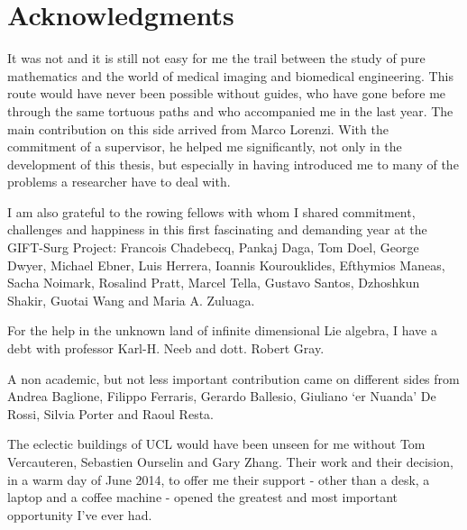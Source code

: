 
\qquad
\pagestyle{empty}
\newpage

\section*{Acknowledgments}
%


It was not and it is still not easy for me the trail between the study of pure mathematics and the world of medical imaging and biomedical engineering. This route would have never been possible without guides, who have gone before me through the same tortuous paths and who accompanied me in the last year. The main contribution on this side arrived from Marco Lorenzi. With the commitment of a supervisor, he helped me significantly, not only in the development of this thesis, but especially in having introduced me to many of the problems a researcher have to deal with.

I am also grateful to the rowing fellows with whom I shared commitment, challenges and happiness in this first fascinating and demanding year at the GIFT-Surg Project: 
Francois Chadebecq, 
Pankaj Daga, 
Tom Doel, 
George Dwyer,
Michael Ebner,
Luis Herrera,
Ioannis Kourouklides,
Efthymios Maneas,
Sacha Noimark,
Rosalind Pratt,
Marcel Tella,
Gustavo Santos,
Dzhoshkun Shakir,
Guotai Wang and Maria A. Zuluaga.

For the help in the unknown land of infinite dimensional Lie algebra, I have a debt with professor Karl-H. Neeb and dott. Robert Gray.

A non academic, but not less important contribution came on different sides from Andrea Baglione, Filippo Ferraris, Gerardo Ballesio, Giuliano `er Nuanda' De Rossi, Silvia Porter and Raoul Resta. 

The eclectic buildings of UCL would have been unseen for me without Tom Vercauteren, Sebastien Ourselin and Gary Zhang. Their work and their decision, in a warm day of June 2014, to offer me their support - other than a desk, a laptop and a coffee machine - opened the greatest and most important opportunity I've ever had.
 
